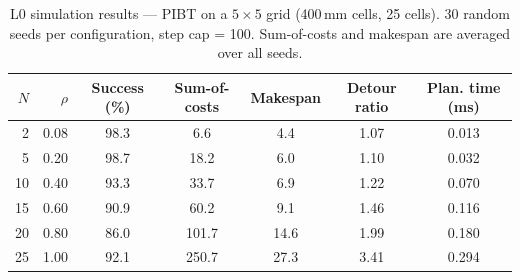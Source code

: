\begin{table}[h]
\centering
\caption{L0 simulation results — PIBT on a $5\times5$ grid (400\,mm cells, 25 cells).
         30 random seeds per configuration, step cap = 100.
         Sum-of-costs and makespan are averaged over all seeds.}
\label{tab:l0_5x5}
\begin{tabular}{rr S[table-format=3.1] S[table-format=3.1] S[table-format=2.1] S[table-format=1.2] S[table-format=1.3]}
\toprule
$N$ & $\rho$ & {Success (\%)} & {Sum-of-costs} & {Makespan} & {Detour ratio} & {Plan. time (ms)} \\
 & 0.08 &  98.3 &   6.6 &  4.4 & 1.07 & 0.013 \\
 5 & 0.20 &  98.7 &  18.2 &  6.0 & 1.10 & 0.032 \\
10 & 0.40 &  93.3 &  33.7 &  6.9 & 1.22 & 0.070 \\
15 & 0.60 &  90.9 &  60.2 &  9.1 & 1.46 & 0.116 \\
20 & 0.80 &  86.0 & 101.7 & 14.6 & 1.99 & 0.180 \\
25 & 1.00 &  92.1 & 250.7 & 27.3 & 3.41 & 0.294 \\
\bottomrule
\end{tabular}
\end{table}
